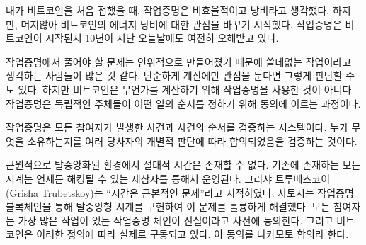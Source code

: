\begin{comment}
	When I first learned how Bitcoin works I also thought that proof-of-work
	is inefficient and wasteful. After a while, I started to shift my
	perspective on Bitcoin's energy consumption~\cite{gigi:energy}. It seems that
	proof-of-work is still widely misunderstood today, in the year 10 AB
	(after Bitcoin).
\end{comment}
내가 비트코인을 처음 접했을 때, 작업증명은 비효율적이고 낭비라고 생각했다.
하지만, 머지않아 비트코인의 에너지 낭비\cite{gigi:energy}에 대한 관점을 바꾸기 시작했다.
작업증명은 비트코인이 시작된지 10년이 지난 오늘날에도 여전히 오해받고 있다.

\begin{comment}
	Since the problems to be solved in proof-of-work are made up, many
	people seem to believe that it is \textit{useless} work. If the focus is purely
	on the computation, this is an understandable conclusion. But Bitcoin
	isn't about computation. It is about \textit{independently agreeing on the
		order of things.}
\end{comment}
작업증명에서 풀어야 할 문제는 인위적으로 만들어졌기 때문에 쓸데없는 작업이라고 생각하는 사람들이 많은 것 같다.
단순하게 계산에만 관점을 둔다면 그렇게 판단할 수도 있다.
하지만 비트코인은 무언가를 계산하기 위해 작업증명을 사용한 것이 아니다.
작업증명은 독립적인 주체들이 어떤 일의 순서를 정하기 위해 동의에 이르는 과정이다.

\begin{comment}
	Proof-of-work is a system in which everyone can validate what happened
	and in what order it happened. This independent validation is what leads
	to consensus, an individual agreement by multiple parties about who owns
	what.
\end{comment}
작업증명은 모든 참여자가 발생한 사건과 사건의 순서를 검증하는 시스템이다.
누가 무엇을 소유하는지를 여러 당사자의 개별적 판단에 따라 합의되었음을 검증하는 것이다.


\begin{comment}
	In a radically decentralized environment, we don't have the luxury of absolute
	time. Any clock would introduce a trusted third party, a central point in the
	system which had to be relied upon and could be attacked. \enquote{Timing is the root
		problem,} as Grisha Trubetskoy points out~\cite{pow-clock}. And Satoshi
	brilliantly solved this problem by implementing a decentralized clock via a
	proof-of-work blockchain. Everyone agrees beforehand that the chain with the
	most cumulative work is the source of truth. It is per definition what actually
	happened. This agreement is what is now known as Nakamoto consensus.
\end{comment}
근원적으로 탈중앙화된 환경에서 절대적 시간은 존재할 수 없다.
기존에 존재하는 모든 시계는 언제든 해킹될 수 있는 제삼자를 통해서 운영된다.
그리샤 트루베츠코이(Grisha Trubetskoy)는  \enquote{시간은 근본적인 문제}라고 지적하였다\cite{pow-clock}.
사토시는 작업증명 블록체인을 통해 탈중앙형 시계를 구현하여 이 문제를 훌륭하게 해결했다.
모든 참여자는 가장 많은 작업이 있는 작업증명 체인이 진실이라고 사전에 동의한다.
그리고 비트코인은 이러한 정의에 따라 실제로 구동되고 있다.
이 동의를 나카모토 합의라 한다.

